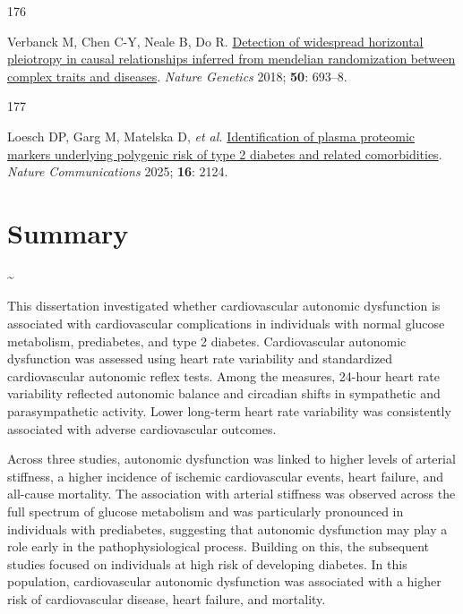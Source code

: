 \documentclass[
  a4paper,
  headsepline=true,
  open=any]{scrbook}
\newlength{\cslhangindent}
\newlength{\csllabelwidth}
\newlength{\cslentryspacingunit} %
\newenvironment{CSLReferences}[2] %
 {%
  \setlength{\parindent}{0pt}
  \ifodd #1
  \let\oldpar\par
  \def\par{\hangindent=\cslhangindent\oldpar}
  \fi
  \setlength{\parskip}{#2\cslentryspacingunit}
 }%
 {}
\newcommand{\CSLLeftMargin}[1]{\parbox[t]{\csllabelwidth}{#1}}
\newcommand{\CSLRightInline}[1]{\parbox[t]{\linewidth - \csllabelwidth}{#1}\break}
\begin{document}
\begin{CSLReferences}{0}{0}
\leavevmode{}%
\CSLLeftMargin{176 }%
\CSLRightInline{Verbanck M, Chen C-Y, Neale B, Do R.
\href{https://doi.org/10.1038/s41588-018-0099-7}{Detection of widespread
horizontal pleiotropy in causal relationships inferred from mendelian
randomization between complex traits and diseases}. \emph{Nature
Genetics} 2018; \textbf{50}: 693--8.}

\leavevmode{}%
\CSLLeftMargin{177 }%
\CSLRightInline{Loesch DP, Garg M, Matelska D, \emph{et al.}
\href{https://doi.org/10.1038/s41467-025-56695-z}{Identification of
plasma proteomic markers underlying polygenic risk of type 2 diabetes
and related comorbidities}. \emph{Nature Communications} 2025;
\textbf{16}: 2124.}

\end{CSLReferences}


\hypertarget{summary}{%
\chapter*{Summary}\label{summary}}


\newpage

\thispagestyle{empty}

\textasciitilde{} \newpage

This dissertation investigated whether cardiovascular autonomic
dysfunction is associated with cardiovascular complications in
individuals with normal glucose metabolism, prediabetes, and type 2
diabetes. Cardiovascular autonomic dysfunction was assessed using heart
rate variability and standardized cardiovascular autonomic reflex tests.
Among the measures, 24-hour heart rate variability reflected autonomic
balance and circadian shifts in sympathetic and parasympathetic
activity. Lower long-term heart rate variability was consistently
associated with adverse cardiovascular outcomes.

Across three studies, autonomic dysfunction was linked to higher levels
of arterial stiffness, a higher incidence of ischemic cardiovascular
events, heart failure, and all-cause mortality. The association with
arterial stiffness was observed across the full spectrum of glucose
metabolism and was particularly pronounced in individuals with
prediabetes, suggesting that autonomic dysfunction may play a role early
in the pathophysiological process. Building on this, the subsequent
studies focused on individuals at high risk of developing diabetes. In
this population, cardiovascular autonomic dysfunction was associated
with a higher risk of cardiovascular disease, heart failure, and
mortality.
\end{document}
